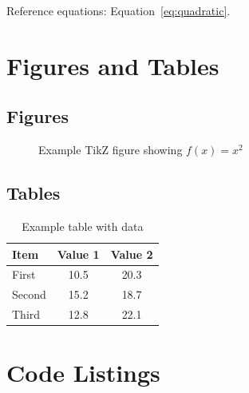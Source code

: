 \documentclass[
    language=english,
    doctype=book,              %
    institution=none,        %
    oneside,                 %
    loadGlossaries,          %
]{../../omnilatex}
\begin{document}
Reference equations: Equation~\eqref{eq:quadratic}.

\chapter{Figures and Tables}

\section{Figures}

\begin{figure}[htbp]
	\centering
	\caption{Example TikZ figure showing $f(x) = x^2$}
	\label{fig:example}
\end{figure}


\section{Tables}

\begin{table}[htbp]
	\centering
	\caption{Example table with data}
	\label{tab:example}
	\begin{tabular}{lcc}
		\toprule
		\textbf{Item} & \textbf{Value 1} & \textbf{Value 2} \\
		\midrule
		First         & 10.5             & 20.3             \\
		Second        & 15.2             & 18.7             \\
		Third         & 12.8             & 22.1             \\
		\bottomrule
	\end{tabular}
\end{table}

\chapter{Code Listings}
\end{document}
